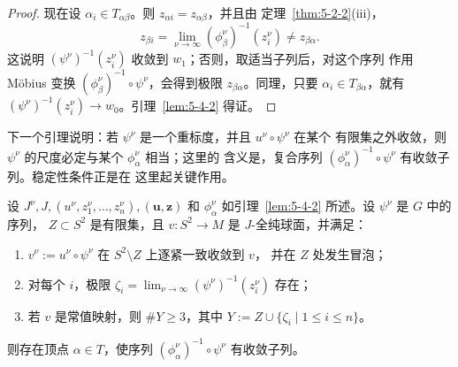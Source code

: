 \begin{proof}
现在设 $\alpha_i\in T_{\alpha\beta}$。则 $z_{\alpha i}=z_{\alpha\beta}$，并且由
定理~\ref{thm:5-2-2}\textup{(iii)}，
\[
  z_{\beta i}
  =\lim_{\nu\to\infty}(\phi_\beta^\nu)^{-1}(z_i^\nu)
  \ne z_{\beta\alpha}.
\]
这说明 $(\psi^\nu)^{-1}(z_i^\nu)$ 收敛到 $w_1$；否则，取适当子列后，对这个序列
作用 Möbius 变换 $(\phi_\beta^\nu)^{-1}\circ\psi^\nu$，会得到极限
$z_{\beta\alpha}$。同理，只要 $\alpha_i\in T_{\beta\alpha}$，就有
$(\psi^\nu)^{-1}(z_i^\nu)\to w_0$。引理~\ref{lem:5-4-2} 得证。
\end{proof}

下一个引理说明：若 $\psi^\nu$ 是一个重标度，并且 $u^\nu\circ\psi^\nu$ 在某个
有限集之外收敛，则 $\psi^\nu$ 的尺度必定与某个 $\phi_\alpha^\nu$ 相当；这里的
含义是，复合序列 $(\phi_\alpha^\nu)^{-1}\circ\psi^\nu$ 有收敛子列。稳定性条件正是在
这里起关键作用。

\begin{lemma}\label{lem:5-4-3}
设 $J^\nu,J,(u^\nu,z_1^\nu,\ldots,z_n^\nu),(\mathbf u,\mathbf z)$ 和
$\phi_\alpha^\nu$ 如引理~\ref{lem:5-4-2} 所述。设 $\psi^\nu$ 是 $G$ 中的序列，
$Z\subset S^2$ 是有限集，且 $v:S^2\to M$ 是 $J$-全纯球面，并满足：
\begin{enumerate}[label=(\alph*),leftmargin=3em]
\item $v^\nu:=u^\nu\circ\psi^\nu$ 在 $S^2\setminus Z$ 上逐紧一致收敛到 $v$，
并在 $Z$ 处发生冒泡；
\item 对每个 $i$，极限
$\zeta_i=\lim_{\nu\to\infty}(\psi^\nu)^{-1}(z_i^\nu)$ 存在；
\item 若 $v$ 是常值映射，则 $\#Y\ge3$，其中
$Y:=Z\cup\{\zeta_i\mid1\le i\le n\}$。
\end{enumerate}
则存在顶点 $\alpha\in T$，使序列
$(\phi_\alpha^\nu)^{-1}\circ\psi^\nu$ 有收敛子列。
\end{lemma}

